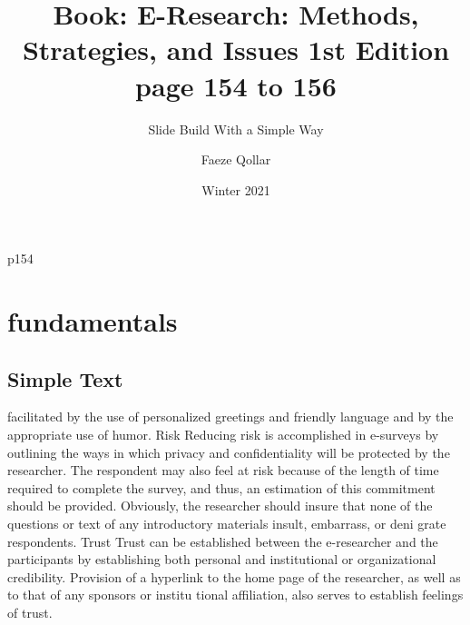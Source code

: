 \documentclass{beamer}
\title{Book: E-Research: Methods, Strategies, and Issues 1st Edition
page 154 to 156}
\subtitle{Slide Build With a Simple Way‌}
\author{Faeze Qollar}
\institute{Payam Nour University}
\date{Winter 2021}
\begin{document}
\begin{frame}
\maketitle
\end{frame}

\everypar{\rightskip\rightmargin}
\begin{frame}{p154}
\section{fundamentals}
\subsection{Simple Text}
facilitated by the use of personalized greetings and friendly language and by the appropriate use of humor. 
Risk 
Reducing risk is accomplished in e-surveys by outlining the ways in which privacy and confidentiality will be protected 
by the researcher. The respondent may also feel at risk because of the length of time required to complete the survey, 
and thus, an estimation of this commitment should be provided. Obviously, the researcher should insure that none of the questions 
or text of any introductory materials insult, embarrass, or deni grate respondents.
Trust 
Trust can be established between the e-researcher and the participants by establishing both personal and institutional or organizational credibility. Provision of a hyperlink to the home page of the researcher, 
as well as to that of any sponsors or institu tional affiliation, also serves to establish feelings of trust.
\end{frame}


\end{document}
